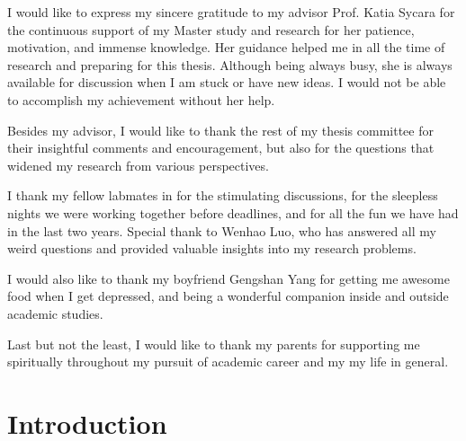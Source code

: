 \documentclass[12pt]{cmuthesis}
\theoremstyle{plain}
\begin{document}
\begin{acknowledgments}
I would like to express my sincere gratitude to my advisor Prof. Katia Sycara for the continuous support of my Master study and research for her patience, motivation, and immense knowledge. Her guidance helped me in all the time of research and preparing for this thesis. Although being always busy, she is always available for discussion when I am stuck or have new ideas. I would not be able to accomplish my achievement without her help.

Besides my advisor, I would like to thank the rest of my thesis committee for their insightful comments and encouragement, but also for the questions that widened my research from various perspectives.

I thank my fellow labmates in for the stimulating discussions, for the sleepless nights we were working together before deadlines, and for all the fun we have had in the last two years. Special thank to Wenhao Luo, who has answered all my weird questions and provided valuable insights into my research problems.

I would also like to thank my boyfriend Gengshan Yang for getting me awesome food when I get depressed, and being a wonderful companion inside and outside academic studies.

Last but not the least, I would like to thank my  parents for supporting me spiritually throughout my pursuit of academic career and my my life in general.
\end{acknowledgments}

\tableofcontents
\listoffigures

\mainmatter


%
%
%
%
%


\chapter{Introduction}

\end{document}
